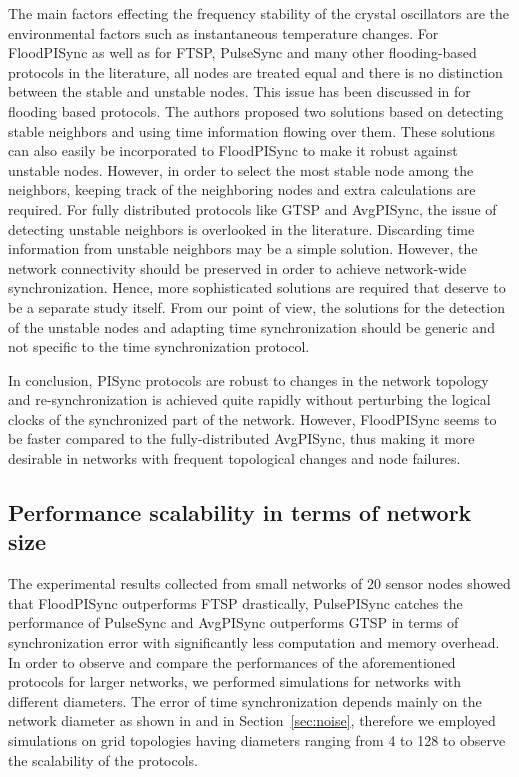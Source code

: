 \documentclass[english,a4paper,10pt,final]{article}
\numberwithin{equation}{section}
\numberwithin{figure}{section}
\begin{document}
The main factors effecting the frequency stability of the crystal oscillators are the environmental factors such as instantaneous temperature changes. For FloodPISync as well as for FTSP, PulseSync and many other flooding-based protocols in the literature, all nodes are treated equal and there is no distinction between the stable and unstable nodes. This issue has been discussed in \cite{Schmid:2010} for flooding based protocols. The authors proposed two solutions based on detecting stable neighbors and using time information flowing over them. These solutions can also easily be incorporated to FloodPISync to make it robust against unstable nodes. However, in order to select the most stable node among the neighbors, keeping track of the neighboring nodes and extra calculations are required.  For fully distributed protocols like GTSP and AvgPISync,  the issue of detecting unstable neighbors is overlooked in the literature. Discarding time information from unstable neighbors may be a simple solution. However, the network connectivity should be preserved in order to achieve network-wide synchronization. Hence, more sophisticated solutions are required that deserve to be a separate study itself. From our point of view, the solutions for the detection of the unstable nodes and adapting time synchronization should be generic and not specific to the time synchronization protocol.


In conclusion, PISync protocols are robust to changes in the network topology and re-synchronization is achieved quite rapidly without perturbing the logical clocks of the synchronized part of the network. However, FloodPISync  seems to be faster compared to the fully-distributed AvgPISync, thus making it more desirable in networks with frequent topological changes and node failures.

\subsection{Performance scalability in terms of network size}\label{sec:simulations}

The experimental results collected from small networks of 20 sensor nodes showed that FloodPISync outperforms FTSP drastically, PulsePISync catches the performance of PulseSync and AvgPISync outperforms GTSP in terms of synchronization error with significantly less computation and memory overhead. In order to observe and compare the performances of the aforementioned protocols for larger networks, we performed simulations for networks with different diameters. The error of time synchronization depends mainly on the network diameter as shown in \cite{Lenzen2009Optimal} and in Section~\ref{sec:noise}, therefore we employed simulations on grid   topologies having diameters ranging from 4 to 128 to observe the scalability of the protocols. 
\end{document}
